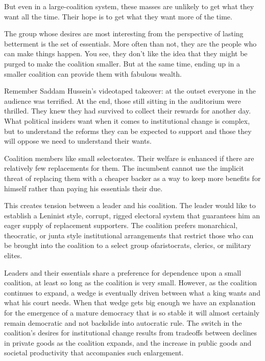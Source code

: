 \documentclass[10pt]{article}
\begin{document}
{\large But even in a large-coalition system, these masses are unlikely to get
what they want all the time. Their hope is to get what they want more of the
time.}

{\large The group whose desires are most interesting from the perspective of
lasting betterment is the set of essentials. More often than not, they are the
people who can make things happen. You see, they don't like the idea that they
might be purged to make the coalition smaller. But at the same time, ending up in
a smaller coalition can provide them with fabulous wealth.}

{\large Remember Saddam Hussein's videotaped takeover: at the outset everyone in
the audience was terrified. At the end, those still sitting in the auditorium
were thrilled. They knew they had survived to collect their rewards for another
day. What political insiders want when it comes to institutional change is
complex, but to understand the reforms they can be expected to support and those
they will oppose we need to understand their wants.}

{\large Coalition members like small selectorates. Their welfare is enhanced if
there are relatively few replacements for them. The incumbent cannot use the
implicit threat of replacing them with a cheaper backer as a way to keep more
benefits for himself rather than paying his essentials their due.}

{\large This creates tension between a leader and his coalition. The leader
would like to establish a Leninist style, corrupt, rigged electoral system that
guarantees him an eager supply of replacement supporters. The coalition prefers
monarchical, theocratic, or junta style institutional arrangements that restrict
those who can be brought into the coalition to a select group ofaristocrats,
clerics, or military elites.}

{\large Leaders and their essentials share a preference for dependence upon a
small coalition, at least so long as the coalition is very small. However, as the
coalition continues to expand, a wedge is eventually driven between what a king
wants and what his court needs. When that wedge gets big enough we have an
explanation for the emergence of a mature democracy that is so stable it will
almost certainly remain democratic and not backslide into autocratic rule. The
switch in the coalition's desires for institutional change results from tradeoffs
between declines in private goods as the coalition expands, and the increase in
public goods and societal productivity that accompanies such enlargement.}
\end{document}
